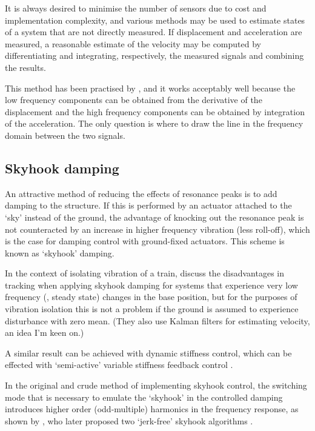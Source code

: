 It is always desired to minimise the number of sensors due to cost and
implementation complexity, and various methods may be used to estimate
states of a system that are not directly measured. If displacement and
acceleration are measured, a reasonable estimate of the velocity may
be computed by differentiating and integrating, respectively, the
measured signals and combining the results.

This method has been practised by \textcite{bennett2007}, and it works
acceptably well because the low frequency components can be obtained
from the derivative of the displacement and the high frequency
components can be obtained by integration of the acceleration. The
only question is where to draw the line in the frequency domain
between the two signals.




\subsection{Skyhook damping}

An attractive method of reducing the effects of resonance peaks is to add
damping to the structure. If this is performed by an actuator attached to the
`sky' instead of the ground, the advantage of knocking out the resonance peak
is not counteracted by an increase in higher frequency vibration (less
roll-off), which is the case for damping control with ground-fixed actuators.
This scheme is known as `skyhook' damping.

In the context of isolating vibration of a train, \textcite{li1999} discuss
the disadvantages in tracking when applying skyhook damping for systems that
experience very low frequency (\ie, steady state) changes in the base
position, but for the purposes of vibration isolation this is not a problem if
the ground is assumed to experience disturbance with zero mean. (They also use
Kalman filters for estimating velocity, an idea I'm keen on.)

A similar result  can be achieved with dynamic stiffness control,
which can be effected with `semi-active' variable stiffness feedback control
\cite{leavitt2007}.

In the original and crude method of implementing skyhook control, the
switching mode that is necessary to emulate the `skyhook' in the controlled
damping introduces higher order (odd-multiple) harmonics in the frequency
response, as shown by \textcite{ahmadian2001}, who later proposed two
`jerk-free' skyhook algorithms \cite{ahmadian2004}.

